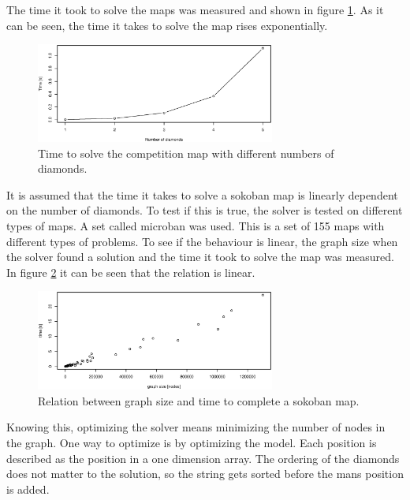 The time it took to solve the maps was measured and shown in figure \ref{fig:complexity_of_sokoban}.
As it can be seen, the time it takes to solve the map rises exponentially.

\begin{figure}[h]
\centering
 \includegraphics[width=0.7\textwidth]{img/sokoban_complexity_time}
 \caption{Time to solve the competition map with different numbers of diamonds.}
 \label{fig:complexity_of_sokoban}
\end{figure}


It is assumed that the time it takes to solve a sokoban map is linearly dependent on the number of diamonds.
To test if this is true, the solver is tested on different types of maps.
A set called microban \cite{url:microban} was used.
This is a set of 155 maps with different types of problems.
To see if the behaviour is linear, the graph size when the solver found a solution and the time it took to solve the map was measured.
In figure \ref{fig:time_vs_graph_size} it can be seen that the relation is linear.

\begin{figure}[h]
\centering
 \includegraphics[width=0.7\textwidth]{img/time_vs_graph_size}
 \caption{Relation between graph size and time to complete a sokoban map.}
 \label{fig:time_vs_graph_size}
\end{figure}

Knowing this, optimizing the solver means minimizing the number of nodes in the graph.
One way to optimize is by optimizing the model.
Each position is described as the position in a one dimension array.
The ordering of the diamonds does not matter to the solution, so the string gets sorted before the mans position is added.

